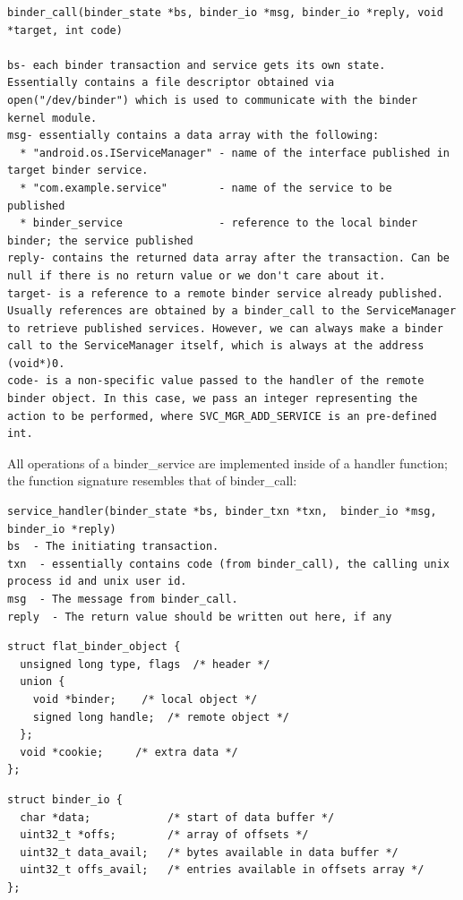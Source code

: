 \documentclass[prodmode]{acmlarge}
\begin{document}
\begin{Verbatim}[samepage=true]
binder_call(binder_state *bs, binder_io *msg, binder_io *reply, void *target, int code)

bs- each binder transaction and service gets its own state. Essentially contains a file descriptor obtained via open("/dev/binder") which is used to communicate with the binder kernel module.
msg- essentially contains a data array with the following:
  * "android.os.IServiceManager" - name of the interface published in target binder service.
  * "com.example.service"        - name of the service to be  published
  * binder_service               - reference to the local binder binder; the service published
reply- contains the returned data array after the transaction. Can be null if there is no return value or we don't care about it.
target- is a reference to a remote binder service already published. Usually references are obtained by a binder_call to the ServiceManager to retrieve published services. However, we can always make a binder call to the ServiceManager itself, which is always at the address (void*)0.
code- is a non-specific value passed to the handler of the remote binder object. In this case, we pass an integer representing the action to be performed, where SVC_MGR_ADD_SERVICE is an pre-defined int.
\end{Verbatim}

All operations of a binder\_service are implemented inside of a handler function; the function signature resembles that of binder\_call:
\begin{Verbatim}[samepage=true]
service_handler(binder_state *bs, binder_txn *txn,  binder_io *msg,  binder_io *reply)
bs  - The initiating transaction.
txn  - essentially contains code (from binder_call), the calling unix process id and unix user id.
msg  - The message from binder_call.
reply  - The return value should be written out here, if any
\end{Verbatim}

\begin{Verbatim}[samepage=true]
struct flat_binder_object {
  unsigned long type, flags  /* header */
  union {
    void *binder;    /* local object */
    signed long handle;  /* remote object */
  };
  void *cookie;     /* extra data */
};
\end{Verbatim}

\begin{Verbatim}[samepage=true]
struct binder_io {
  char *data;            /* start of data buffer */
  uint32_t *offs;        /* array of offsets */
  uint32_t data_avail;   /* bytes available in data buffer */
  uint32_t offs_avail;   /* entries available in offsets array */
};
\end{Verbatim}
\end{document}
